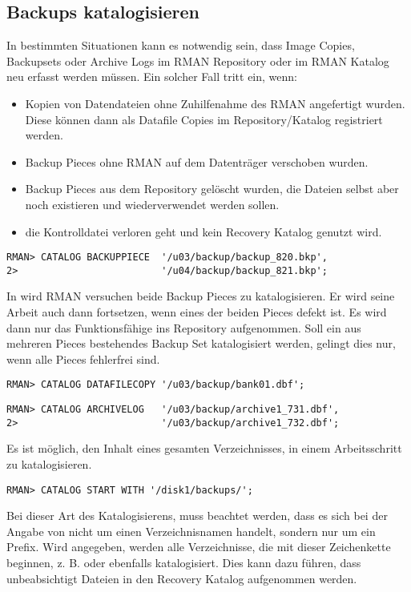       \subsection{Backups katalogisieren}
        In bestimmten Situationen kann es notwendig sein, dass Image Copies, Backupsets oder Archive Logs im RMAN Repository oder im RMAN Katalog neu erfasst werden müssen. Ein solcher Fall tritt ein, wenn:
        \begin{itemize}
          \item Kopien von Datendateien ohne Zuhilfenahme des RMAN angefertigt wurden. Diese können dann als Datafile Copies im Repository/Katalog registriert werden.
          \item Backup Pieces ohne RMAN auf dem Datenträger verschoben wurden.
          \item Backup Pieces aus dem Repository gelöscht wurden, die Dateien selbst aber noch existieren und wiederverwendet werden sollen.
          \item die Kontrolldatei verloren geht und kein Recovery Katalog genutzt wird.
          \end{itemize}
        \begin{lstlisting}[caption={Backup Pieces katalogisieren},label=admin1328,language=rman]
RMAN> CATALOG BACKUPPIECE  '/u03/backup/backup_820.bkp',
2>                         '/u04/backup/backup_821.bkp';
        \end{lstlisting}
        In  wird RMAN versuchen beide Backup Pieces zu katalogisieren. Er wird seine Arbeit auch dann fortsetzen, wenn eines der beiden Pieces defekt ist. Es wird dann nur das Funktionsfähige ins Repository aufgenommen. Soll ein aus mehreren Pieces bestehendes Backup Set katalogisiert werden, gelingt dies nur, wenn alle Pieces fehlerfrei sind.
        \begin{lstlisting}[caption={Datendatei-Kopien katalogisieren},label=admin1329,language=rman]
RMAN> CATALOG DATAFILECOPY '/u03/backup/bank01.dbf';
        \end{lstlisting}
        \begin{lstlisting}[caption={Archive Logs katalogisieren},label=admin1330,language=rman]
RMAN> CATALOG ARCHIVELOG   '/u03/backup/archive1_731.dbf',
2>                         '/u03/backup/archive1_732.dbf';
        \end{lstlisting}
        Es ist möglich, den Inhalt eines gesamten Verzeichnisses, in einem Arbeitsschritt zu katalogisieren.
        \begin{lstlisting}[caption={Verzeichnisinhalt katalogisieren},label=admin1331,language=rman]
RMAN> CATALOG START WITH '/disk1/backups/';
        \end{lstlisting}
        Bei dieser Art des Katalogisierens, muss beachtet werden, dass es sich bei der Angabe von  nicht um einen Verzeichnisnamen handelt, sondern nur um ein Prefix. Wird  angegeben, werden alle Verzeichnisse, die mit dieser Zeichenkette beginnen, z. B.  oder  ebenfalls katalogisiert. Dies kann dazu führen, dass unbeabsichtigt  Dateien in den Recovery Katalog aufgenommen werden.

